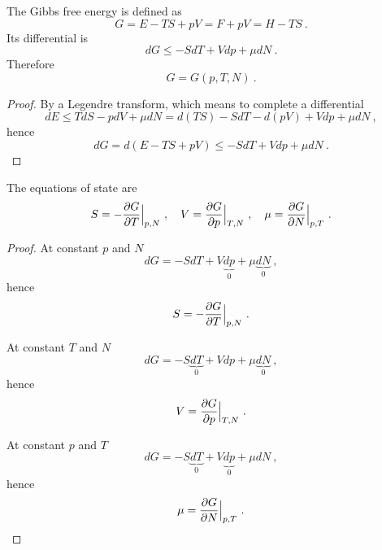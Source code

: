     The Gibbs free energy is defined as 
    \begin{equation*}
        G = E - TS + pV = F + pV = H - TS ~.
    \end{equation*}
    Its differential is 
    \begin{equation*}
        dG \leq - SdT + Vdp + \mu dN ~.
    \end{equation*}
    Therefore
    \begin{equation*}
        G = G(p, T, N) ~.
    \end{equation*}
    \begin{proof}
        By a Legendre transform, which means to complete a differential
        \begin{equation*}
            dE \leq T dS - p dV + \mu dN = d(TS) - S dT - d(pV) + V dp + \mu dN ~,
        \end{equation*}
        hence 
        \begin{equation*}
            dG = d(E - TS + pV) \leq - S dT + Vdp + \mu dN ~.
        \end{equation*}
    \end{proof}

    The equations of state are
    \begin{equation}\label{ges}
        S = - \frac{\partial G}{\partial T} \Big \vert_{p,N} ~, \quad V = \frac{\partial G}{\partial p} \Big \vert_{T,N} ~, \quad \mu = \frac{\partial G}{\partial N} \Big \vert_{p,T} ~. 
    \end{equation}
    \begin{proof}
        At constant $p$ and $N$
        \begin{equation*}
            dG = - S dT + V\underbrace{dp }_0 + \mu \underbrace{dN}_0  ~,
        \end{equation*}
        hence 
        \begin{equation*}
            S = - \frac{\partial G}{\partial T} \Big \vert_{p,N}  ~.
        \end{equation*}

        At constant $T$ and $N$
        \begin{equation*}
            dG = - S \underbrace{dT}_0  + Vdp + \mu \underbrace{dN}_0  ~,
        \end{equation*}
        hence 
        \begin{equation*}
            V = \frac{\partial G}{\partial p} \Big \vert_{T,N} ~.
        \end{equation*}

        At constant $p$ and $T$
        \begin{equation*}
            dG = - S \underbrace{dT}_0  + V\underbrace{dp}_0  + \mu dN ~,
        \end{equation*}
        hence 
        \begin{equation*}
            \mu = \frac{\partial G}{\partial N} \Big \vert_{p,T} ~.
        \end{equation*}
    \end{proof}


